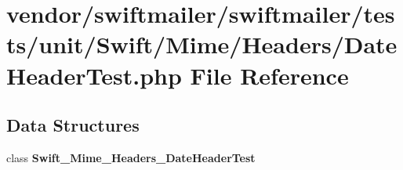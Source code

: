 \section{vendor/swiftmailer/swiftmailer/tests/unit/\+Swift/\+Mime/\+Headers/\+Date\+Header\+Test.php File Reference}
\label{_date_header_test_8php}
\subsection*{Data Structures}
\begin{DoxyCompactItemize}
\item 
class {\bf Swift\+\_\+\+Mime\+\_\+\+Headers\+\_\+\+Date\+Header\+Test}
\end{DoxyCompactItemize}
